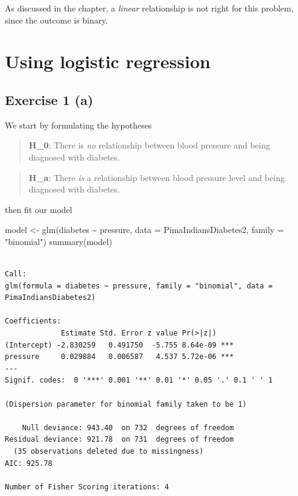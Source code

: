 \documentclass[
  letterpaper,
  DIV=11,
  numbers=noendperiod]{scrreprt}
\newenvironment{Shaded}{\begin{snugshade}}{\end{snugshade}}
\newcommand{\AttributeTok}[1]{\textcolor[rgb]{0.40,0.45,0.13}{#1}}
\newcommand{\FunctionTok}[1]{\textcolor[rgb]{0.28,0.35,0.67}{#1}}
\newcommand{\NormalTok}[1]{\textcolor[rgb]{0.00,0.23,0.31}{#1}}
\newcommand{\OtherTok}[1]{\textcolor[rgb]{0.00,0.23,0.31}{#1}}
\newcommand{\SpecialCharTok}[1]{\textcolor[rgb]{0.37,0.37,0.37}{#1}}
\newcommand{\StringTok}[1]{\textcolor[rgb]{0.13,0.47,0.30}{#1}}
\begin{document}
As discussed in the chapter, a \emph{linear} relationship is not right
for this problem, since the outcome is binary.

\section{Using logistic regression}\label{using-logistic-regression-1}

\subsection{Exercise 1 (a)}\label{exercise-1-a}

We start by formulating the hypotheses

\begin{quote}
\textbf{H\_0}: There is \emph{no} relationship between blood pressure
and being diagnosed with diabetes.
\end{quote}

\begin{quote}
\textbf{H\_a}: There \emph{is} a relationship between blood pressure
level and being diagnosed with diabetes.
\end{quote}

then fit our model

\begin{Shaded}
\begin{Highlighting}[]
\NormalTok{model }\OtherTok{\textless{}{-}} \FunctionTok{glm}\NormalTok{(diabetes }\SpecialCharTok{\textasciitilde{}}\NormalTok{ pressure, }\AttributeTok{data =}\NormalTok{ PimaIndiansDiabetes2, }\AttributeTok{family =} \StringTok{"binomial"}\NormalTok{)}
\FunctionTok{summary}\NormalTok{(model)}
\end{Highlighting}
\end{Shaded}

\begin{verbatim}

Call:
glm(formula = diabetes ~ pressure, family = "binomial", data = PimaIndiansDiabetes2)

Coefficients:
             Estimate Std. Error z value Pr(>|z|)    
(Intercept) -2.830259   0.491750  -5.755 8.64e-09 ***
pressure     0.029884   0.006587   4.537 5.72e-06 ***
---
Signif. codes:  0 '***' 0.001 '**' 0.01 '*' 0.05 '.' 0.1 ' ' 1

(Dispersion parameter for binomial family taken to be 1)

    Null deviance: 943.40  on 732  degrees of freedom
Residual deviance: 921.78  on 731  degrees of freedom
  (35 observations deleted due to missingness)
AIC: 925.78

Number of Fisher Scoring iterations: 4
\end{verbatim}
\end{document}

